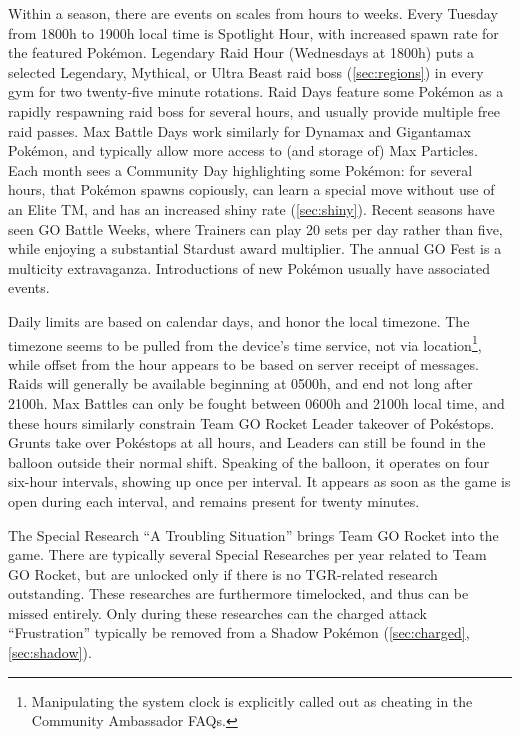 Within a season, there are events on scales from hours to weeks.
Every Tuesday from 1800h to 1900h local time is Spotlight Hour, with
 increased spawn rate for the featured Pokémon.
Legendary Raid Hour (Wednesdays at 1800h) puts a selected Legendary, Mythical,
 or Ultra Beast raid boss (\autoref{sec:regions}) in every gym for two
 twenty-five minute rotations.
Raid Days feature some Pokémon as a rapidly respawning raid boss for several hours,
 and usually provide multiple free raid passes.
Max Battle Days work similarly for Dynamax and Gigantamax Pokémon, and typically
 allow more access to (and storage of) Max Particles.
Each month sees a Community Day highlighting some Pokémon: for several hours,
 that Pokémon spawns copiously, can learn a special move without use of an
 Elite TM, and has an increased shiny rate (\autoref{sec:shiny}).
Recent seasons have seen GO Battle Weeks, where Trainers can play 20 sets
 per day rather than five, while enjoying a substantial Stardust award multiplier.
The annual GO Fest is a multicity extravaganza.
Introductions of new Pokémon usually have associated events.

Daily limits are based on calendar days, and honor the local timezone.
The timezone seems to be pulled from the device's time service, not via location\footnote{Manipulating
 the system clock is explicitly called out as cheating in the Community Ambassador FAQs.},
 while offset from the hour appears to be based on server receipt of messages.
Raids will generally be available beginning at 0500h, and end not long after 2100h.
Max Battles can only be fought between 0600h and 2100h local time,
 and these hours similarly constrain Team GO Rocket Leader takeover of Pokéstops.
Grunts take over Pokéstops at all hours, and Leaders can still be found
 in the balloon outside their normal shift.
Speaking of the balloon, it operates on four six-hour intervals, showing up once per interval.
It appears as soon as the game is open during each interval, and remains present for twenty minutes.

The Special Research ``A Troubling Situation'' brings Team GO Rocket into the game.
There are typically several Special Researches per year related to Team GO Rocket,
 but are unlocked only if there is no TGR-related research outstanding.
These researches are furthermore timelocked, and thus can be missed entirely.
Only during these researches can the charged attack ``Frustration'' typically be removed
 from a Shadow Pokémon (\autoref{sec:charged}, \autoref{sec:shadow}).
